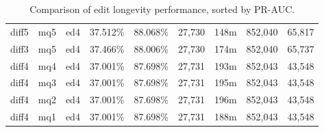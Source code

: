 \begin{sidewaystable}[!ph]
\begin{center}
\begin{tabular}{|c|c|c||c|c||c|c|c|c|}
diff5 & mq5 & ed4 & 37.512\% & 88.068\% & 27,730 & 148m & 852,040 & 65,817 \\
diff3 & mq5 & ed4 & 37.466\% & 88.006\% & 27,730 & 174m & 852,040 & 65,737 \\
diff4 & mq4 & ed4 & 37.001\% & 87.698\% & 27,731 & 193m & 852,043 & 43,548 \\
diff4 & mq3 & ed4 & 37.001\% & 87.698\% & 27,731 & 195m & 852,043 & 43,548 \\
diff4 & mq2 & ed4 & 37.001\% & 87.698\% & 27,731 & 196m & 852,043 & 43,548 \\
diff4 & mq1 & ed4 & 37.001\% & 87.698\% & 27,731 & 188m & 852,043 & 43,548 \\
\hline
\end{tabular}
\end{center}
\caption{Comparison of edit longevity performance,
    sorted by PR-AUC.}
\label{tab:editshoutI}
\end{sidewaystable}
\clearpage
